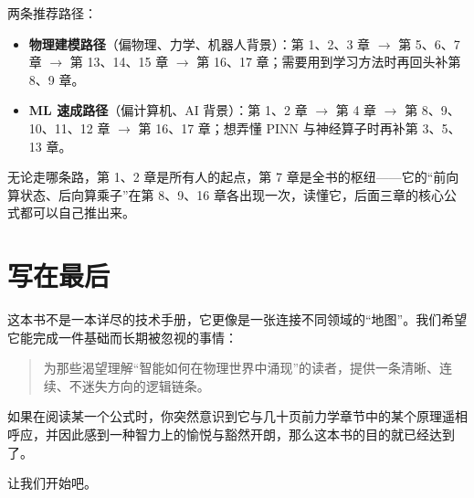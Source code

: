 两条推荐路径：
\begin{itemize}
    \item \textbf{物理建模路径}（偏物理、力学、机器人背景）：第 1、2、3 章 $\to$ 第 5、6、7 章 $\to$ 第 13、14、15 章 $\to$ 第 16、17 章；需要用到学习方法时再回头补第 8、9 章。
    \item \textbf{ML 速成路径}（偏计算机、AI 背景）：第 1、2 章 $\to$ 第 4 章 $\to$ 第 8、9、10、11、12 章 $\to$ 第 16、17 章；想弄懂 PINN 与神经算子时再补第 3、5、13 章。
\end{itemize}
无论走哪条路，第 1、2 章是所有人的起点，第 7 章是全书的枢纽——它的“前向算状态、后向算乘子”在第 8、9、16 章各出现一次，读懂它，后面三章的核心公式都可以自己推出来。

\section*{写在最后}

这本书不是一本详尽的技术手册，它更像是一张连接不同领域的“地图”。我们希望它能完成一件基础而长期被忽视的事情：
\begin{quote}
为那些渴望理解“智能如何在物理世界中涌现”的读者，提供一条清晰、连续、不迷失方向的逻辑链条。
\end{quote}

如果在阅读某一个公式时，你突然意识到它与几十页前力学章节中的某个原理遥相呼应，并因此感到一种智力上的愉悦与豁然开朗，那么这本书的目的就已经达到了。

让我们开始吧。
